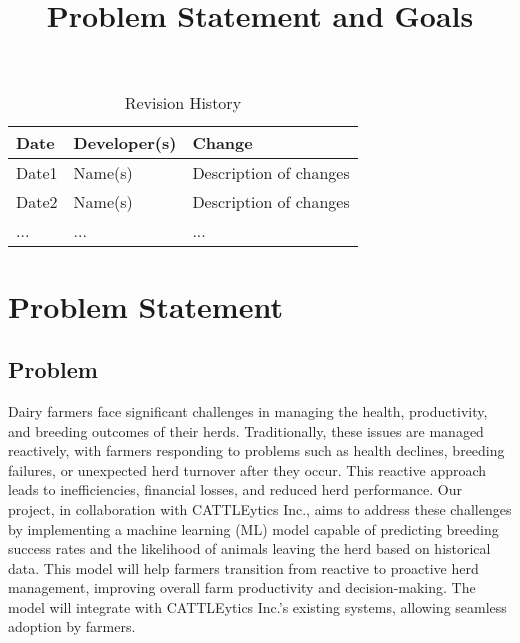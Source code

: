 \documentclass{article}
\title{Problem Statement and Goals\\\progname}
\author{\authname}
\date{}
\begin{document}
\maketitle

\begin{table}[hp]
\caption{Revision History} \label{TblRevisionHistory}
\begin{tabularx}{\textwidth}{llX}
\toprule
\textbf{Date} & \textbf{Developer(s)} & \textbf{Change}\\
\midrule
Date1 & Name(s) & Description of changes\\
Date2 & Name(s) & Description of changes\\
... & ... & ...\\
\bottomrule
\end{tabularx}
\end{table}

\section{Problem Statement}

\subsection{Problem}

Dairy farmers face significant challenges in managing the health, productivity, and breeding outcomes of their herds. Traditionally, these issues are managed reactively, with farmers responding to problems such as health declines, breeding failures, or unexpected herd turnover after they occur. This reactive approach leads to inefficiencies, financial losses, and reduced herd performance. Our project, in collaboration with CATTLEytics Inc., aims to address these challenges by implementing a machine learning (ML) model capable of predicting breeding success rates and the likelihood of animals leaving the herd based on historical data. This model will help farmers transition from reactive to proactive herd management, improving overall farm productivity and decision-making. The model will integrate with CATTLEytics Inc.'s existing systems, allowing seamless adoption by farmers.


\end{document}
